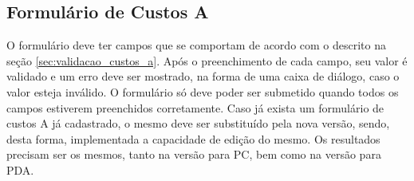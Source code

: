 \subsection{Formulário de Custos A}
\label{sec:metodo_custos_a}

O formulário deve ter campos que se comportam de acordo com o descrito na seção \ref{sec:validacao_custos_a}. Após o preenchimento de cada campo, seu valor é validado e um erro deve ser mostrado, na forma de uma caixa de diálogo, caso o valor esteja inválido. O formulário só deve poder ser submetido quando todos os campos estiverem preenchidos corretamente. Caso já exista um formulário de custos A já cadastrado, o mesmo deve ser substituído pela nova versão, sendo, desta forma, implementada a capacidade de edição do mesmo. Os resultados precisam ser os mesmos, tanto na versão para PC, bem como na versão para PDA.
